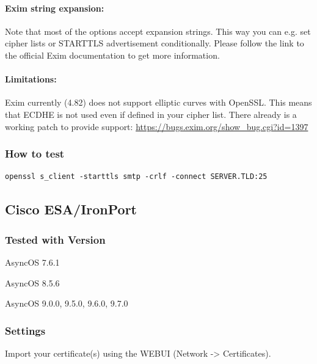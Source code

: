 \paragraph{Exim string expansion:}
Note that most of the options accept expansion strings. This way you can e.g. set cipher lists or STARTTLS advertisement conditionally. Please follow the link to the official Exim documentation to get more information.

\paragraph{Limitations:}
Exim currently (4.82) does not support elliptic curves with OpenSSL. This means that ECDHE is not used even if defined in your cipher list.
There already is a working patch to provide support:
\url{https://bugs.exim.org/show_bug.cgi?id=1397}

\subsubsection{How to test}
\begin{lstlisting}
openssl s_client -starttls smtp -crlf -connect SERVER.TLD:25
\end{lstlisting}




\subsection{Cisco ESA/IronPort}
\subsubsection{Tested with Version}
\begin{itemize*}
  \item AsyncOS 7.6.1
  \item AsyncOS 8.5.6
  \item AsyncOS 9.0.0, 9.5.0, 9.6.0, 9.7.0
\end{itemize*}

\subsubsection{Settings}
Import your certificate(s) using the WEBUI (Network -> Certificates).

